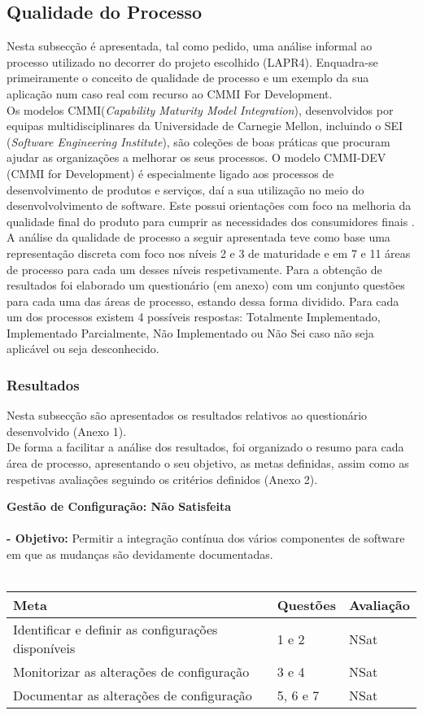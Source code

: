\documentclass[openany,10pt,a4paper]{article}
\begin{document}
\subsection{Qualidade do Processo}
Nesta subsecção é apresentada, tal como pedido, uma análise informal ao processo utilizado no decorrer do projeto escolhido (LAPR4). Enquadra-se primeiramente o conceito de qualidade de processo e um exemplo da sua aplicação num caso real com recurso ao CMMI For Development. \\
Os modelos CMMI(\textit{Capability Maturity Model Integration}), desenvolvidos por equipas multidisciplinares da Universidade de Carnegie Mellon, incluindo o SEI (\textit{Software Engineering Institute}), são coleções de boas práticas que procuram ajudar as organizações a melhorar os seus processos. O modelo CMMI-DEV (CMMI for Development) é especialmente ligado aos processos de desenvolvimento de produtos e serviços, daí a sua utilização no meio do desenvolvolvimento de software. Este possui orientações com foco na melhoria da qualidade final do produto para cumprir as necessidades dos consumidores finais \cite{CMMIProductTeam2010}.\\ 
A análise da qualidade de processo a seguir apresentada teve como base uma representação discreta com foco nos níveis 2 e 3 de maturidade e em 7 e 11 áreas de processo para cada um desses níveis respetivamente. Para a obtenção de resultados foi elaborado um questionário (em anexo) com um conjunto questões para cada uma das áreas de processo, estando dessa forma dividido. Para cada um dos processos existem 4 possíveis respostas: Totalmente Implementado, Implementado Parcialmente, Não Implementado ou Não Sei caso não seja aplicável ou seja desconhecido.

\subsubsection{Resultados}
Nesta subsecção são apresentados os resultados relativos ao questionário desenvolvido (Anexo 1). \\
De forma a facilitar a análise dos resultados, foi organizado o resumo para cada área de processo, apresentando o seu objetivo, as metas definidas, assim como as respetivas avaliações seguindo os critérios definidos (Anexo 2).

\textbf{Gestão de Configuração: Não Satisfeita} \\ \\
\textbf{- Objetivo:} Permitir a integração contínua dos vários componentes de software em que as mudanças são devidamente documentadas. \\
\\
\begin{tabular}{p{3in}|p{1.5in}|p{1.5in}}
\textbf{Meta} & \textbf{Questões} & \textbf{Avaliação} \\ \hline
Identificar e definir as configurações disponíveis & 1 e 2 & NSat \\
Monitorizar as alterações de configuração  & 3 e 4 & NSat \\
Documentar as alterações de configuração  & 5, 6 e 7 & NSat \\
\end{tabular} \\
\end{document}
